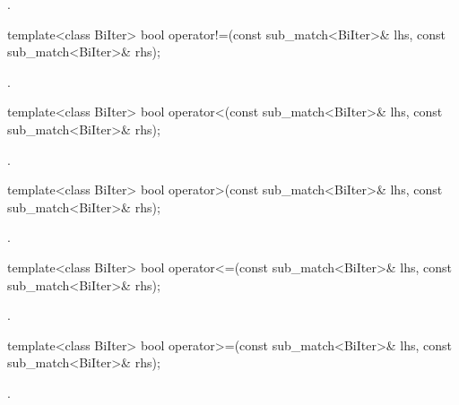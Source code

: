 \begin{itemdescr}
\pnum\returns {}.
\end{itemdescr}

%
\begin{itemdecl}
template<class BiIter>
  bool operator!=(const sub_match<BiIter>& lhs, const sub_match<BiIter>& rhs);
\end{itemdecl}

\begin{itemdescr}
\pnum\returns {}.
\end{itemdescr}

%
\begin{itemdecl}
template<class BiIter>
  bool operator<(const sub_match<BiIter>& lhs, const sub_match<BiIter>& rhs);
\end{itemdecl}

\begin{itemdescr}
\pnum\returns {}.
\end{itemdescr}

%
\begin{itemdecl}
template<class BiIter>
  bool operator>(const sub_match<BiIter>& lhs, const sub_match<BiIter>& rhs);
\end{itemdecl}

\begin{itemdescr}
\pnum\returns {}.
\end{itemdescr}

%
\begin{itemdecl}
template<class BiIter>
  bool operator<=(const sub_match<BiIter>& lhs, const sub_match<BiIter>& rhs);
\end{itemdecl}

\begin{itemdescr}
\pnum\returns {}.
\end{itemdescr}

%
\begin{itemdecl}
template<class BiIter>
  bool operator>=(const sub_match<BiIter>& lhs, const sub_match<BiIter>& rhs);
\end{itemdecl}

\begin{itemdescr}
\pnum\returns {}.
\end{itemdescr}


